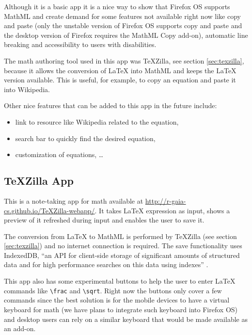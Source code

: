 Although it is a basic app it is a nice way to show that Firefox OS supports
MathML and create demand for some features not available right now like copy and
paste (only the unstable version of Firefox OS supports copy and paste and the
desktop version of Firefox requires the MathML Copy add-on),
automatic line breaking and accessibility to users with disabilities.

The math authoring tool used in this app was TeXZilla, see section
\ref{sec:texzilla}, because it allows the conversion of LaTeX into MathML and
keeps the LaTeX version available. This is useful, for example, to copy an equation
and paste it into Wikipedia.

Other nice features that can be added to this app in the future include:
\begin{itemize}
  \item link to resource like Wikipedia related to the equation,
  \item search bar to quickly find the desired equation,
  \item customization of equations, \ldots
\end{itemize}

\subsection{TeXZilla App}
\label{sec:texzillapp}

This is a note-taking app for math available at
\href{http://r-gaia-cs.github.io/TeXZilla-webapp/}{http://r-gaia-cs.github.io/TeXZilla-webapp/}.
It takes LaTeX expression as input, shows a preview of it refreshed during
input and enables the user to save it.

The conversion from LaTeX to MathML is performed by TeXZilla
(see section \ref{sec:texzilla})
and no internet connection is required. The save functionality
uses IndexedDB, ``an API for client-side storage of significant amounts of
structured data and for high performance searches on this data using indexes''
 \cite{IndexedDatabaseAPI}.

This app also has some experimental buttons to help the user to enter LaTeX commands like
{\tt \textbackslash frac} and {\tt \textbackslash sqrt}. Right now the buttons
only cover a few commands since the best solution is for the mobile devices
to have a virtual keyboard for math (we have plans to integrate
such keyboard into Firefox OS) and desktop users can rely on a similar keyboard
that would be made available as an add-on.

